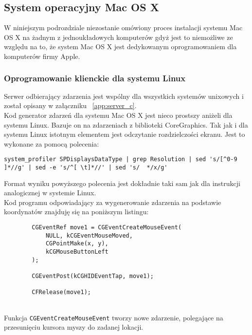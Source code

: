 \subsection{System operacyjny Mac OS X}
W niniejszym podrozdziale niezostanie omówiony proces instalacji systemu Mac OS X na żadnym z jednoukładowych komputerów gdyż jest to niemożliwe ze względu na to, że system Mac OS X jest dedykowanym oprogramowaniem dla komputerów firmy Apple. 
\subsubsection{Oprogramowanie klienckie dla systemu Linux}

Serwer odbierający zdarzenia jest wspólny dla wszystkich systemów unixowych i został opisany w załączniku ~\ref{app:server_c}.
\\
Kod generator zdarzeń dla systemu Mac OS X jest nieco prostszy aniżeli dla systemu Linux. Bazuje on na zdarzeniach z biblioteki CoreGraphics. Tak jak i dla systemu Linux istotnym elementem jest odczytanie rozdzielczości ekranu. Jest to wykonane za pomocą polecenia:
\begin{lstlisting}
system_profiler SPDisplaysDataType | grep Resolution | sed 's/[^0-9 ]*//g' | sed -e 's/^[ \t]*//' | sed 's/  */x/g'
\end{lstlisting}
Format wyniku powyższego polecenia jest dokładnie taki sam jak dla instrukcji analogicznej w systemie Linux.
\\
Kod programu odpowiadający za wygenerowanie zdarzenia na podstawie koordynatów znajduję się na poniższym listingu:
\begin{lstlisting}
		CGEventRef move1 = CGEventCreateMouseEvent(
		    NULL, kCGEventMouseMoved,
			CGPointMake(x, y),
			kCGMouseButtonLeft
		);

		CGEventPost(kCGHIDEventTap, move1);

		CFRelease(move1);
\end{lstlisting}

\\
Funkcja \lstinline|CGEventCreateMouseEvent| tworzy nowe zdarzenie, polegające na przesunięciu kursora myszy do zadanej lokacji.

